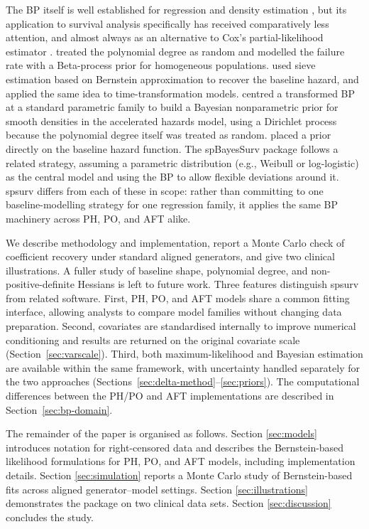 \documentclass[5p,lefttitle]{elsarticle}
\providecommand{\pkg}[1]{\textsf{#1}}
\begin{document}
The BP itself is well established for regression \citep{Tenbusch:1997, Chang:2007} and density estimation \citep{Vitale:1975, Petrone:1999, Babu:2002}, but its application to survival analysis specifically has received comparatively less attention, and almost always as an alternative to Cox's partial-likelihood estimator \citep{Cox:1972}. \citet{Chang:2005} treated the polynomial degree as random and modelled the failure rate with a Beta-process prior for homogeneous populations. \citet{Osman:2012} used sieve estimation based on Bernstein approximation to recover the baseline hazard, and \citet{Mclain:2013} applied the same idea to time-transformation models. \citet{Chen:2014} centred a transformed BP at a standard parametric family to build a Bayesian nonparametric prior for smooth densities in the accelerated hazards model, using a Dirichlet process because the polynomial degree itself was treated as random. \citet{Zhou:2018} placed a prior directly on the baseline hazard function. The \pkg{spBayesSurv} package \citep{Zhou:2021} follows a related strategy, assuming a parametric distribution (e.g., Weibull or log-logistic) as the central model and using the BP to allow flexible deviations around it. \pkg{spsurv} differs from each of these in scope: rather than committing to one baseline-modelling strategy for one regression family, it applies the same BP machinery across PH, PO, and AFT alike.

We describe methodology and implementation, report a Monte Carlo check of
coefficient recovery under standard aligned generators, and give two clinical
illustrations. A fuller study of baseline shape, polynomial degree, and
non-positive-definite Hessians is left to future work. Three features distinguish \pkg{spsurv} from related
software. First, PH, PO, and AFT models share a common fitting interface, allowing analysts to compare model families without changing data preparation. Second, covariates are standardised internally to improve numerical conditioning and results are returned on the original covariate scale (Section~\ref{sec:varscale}). Third, both maximum-likelihood and Bayesian estimation are available within the same framework, with uncertainty handled separately for the two approaches (Sections~\ref{sec:delta-method}--\ref{sec:priors}). The computational differences between the PH/PO and AFT implementations are described in Section~\ref{sec:bp-domain}.

The remainder of the paper is organised as follows. Section
\ref{sec:models} introduces notation for right-censored data and
describes the Bernstein-based likelihood formulations for PH, PO, and
AFT models, including implementation details. Section
\ref{sec:simulation} reports a Monte Carlo study of Bernstein-based
fits across aligned generator--model settings. Section
\ref{sec:illustrations} demonstrates the package on two clinical data
sets. Section \ref{sec:discussion} concludes the study.
\end{document}
